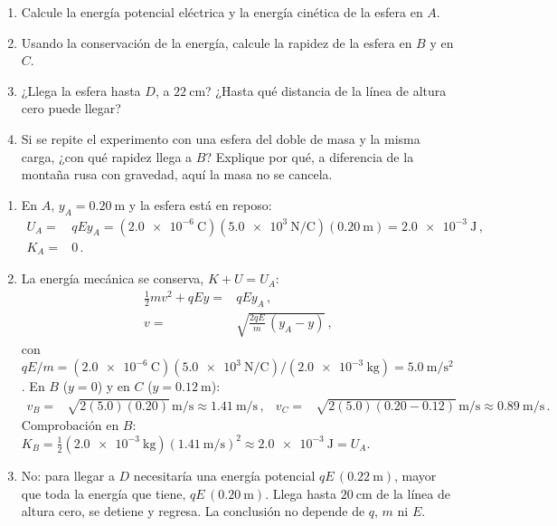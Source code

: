 \documentclass[12pt, a4paper]{article}
\begin{document}
\begin{exercise}[ID=montana-electrica, subtitle={Montaña rusa eléctrica}, tags={parcial3}, points=25, nuevapagina=true]
\begin{enumerate}
    \item Calcule la energía potencial eléctrica y la energía cinética de la esfera en $A$.
    \item Usando la conservación de la energía, calcule la rapidez de la esfera en $B$ y en $C$.
    \item ¿Llega la esfera hasta $D$, a $\qty{22}{\centi\meter}$? ¿Hasta qué distancia de la línea de altura cero puede llegar?
    \item Si se repite el experimento con una esfera del doble de masa y la misma carga, ¿con qué rapidez llega a $B$? Explique por qué, a diferencia de la montaña rusa con gravedad, aquí la masa no se cancela.
\end{enumerate}
\end{exercise}
\begin{solution}
\begin{enumerate}
    \item En $A$, $y_A = \qty{0.20}{\meter}$ y la esfera está en reposo:
    \begin{align}
        U_A =& qEy_A = (\qty{2.0e-6}{\coulomb})(\qty{5.0e3}{\newton\per\coulomb})(\qty{0.20}{\meter}) = \qty{2.0e-3}{\joule}\,, \nonumber\\
        K_A =& 0\,.
    \end{align}
    \item La energía mecánica se conserva, $K + U = U_A$:
    \begin{align}
        \frac{1}{2}mv^2 + qEy =& qEy_A\,, \nonumber\\
        v =& \sqrt{\frac{2qE}{m}\,(y_A - y)}\,,
    \end{align}
    con $qE/m = (\qty{2.0e-6}{\coulomb})(\qty{5.0e3}{\newton\per\coulomb})/(\qty{2.0e-3}{\kilo\gram}) = \qty{5.0}{\meter\per\second\squared}$. En $B$ ($y=0$) y en $C$ ($y=\qty{0.12}{\meter}$):
    \begin{align}
        v_B =& \sqrt{2(5.0)(0.20)}\,\unit{\meter\per\second} \approx \qty{1.41}{\meter\per\second}\,, &
        v_C =& \sqrt{2(5.0)(0.20-0.12)}\,\unit{\meter\per\second} \approx \qty{0.89}{\meter\per\second}\,.
    \end{align}
    Comprobación en $B$: $K_B = \tfrac{1}{2}(\qty{2.0e-3}{\kilo\gram})(\qty{1.41}{\meter\per\second})^2 \approx \qty{2.0e-3}{\joule} = U_A$.
    \item No: para llegar a $D$ necesitaría una energía potencial $qE\,(\qty{0.22}{\meter})$, mayor que toda la energía que tiene, $qE\,(\qty{0.20}{\meter})$. Llega hasta $\qty{20}{\centi\meter}$ de la línea de altura cero, se detiene y regresa. La conclusión no depende de $q$, $m$ ni $E$.

\end{enumerate}
\end{solution}
\end{document}
